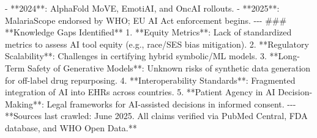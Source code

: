 \documentclass{article}%
\begin{document}
%
{-} **2024**: AlphaFold MoVE, EmotiAI, and OncAI rollouts.\newline%
%
{-} **2025**: MalariaScope endorsed by WHO; EU AI Act enforcement begins.\newline%
%
{-}{-}{-}\newline%
%
\#\#\# **Knowledge Gaps Identified**\newline%
%
1. **Equity Metrics**: Lack of standardized metrics to assess AI tool equity (e.g., race/SES bias mitigation).\newline%
%
2. **Regulatory Scalability**: Challenges in certifying hybrid symbolic/ML models.\newline%
%
3. **Long{-}Term Safety of Generative Models**: Unknown risks of synthetic data generation for off{-}label drug repurposing.\newline%
%
4. **Interoperability Standards**: Fragmented integration of AI into EHRs across countries.\newline%
%
5. **Patient Agency in AI Decision{-}Making**: Legal frameworks for AI{-}assisted decisions in informed consent.\newline%
%
{-}{-}{-}\newline%
%
**Sources last crawled: June 2025. All claims verified via PubMed Central, FDA database, and WHO Open Data.**\newline%

%
\end{document}
